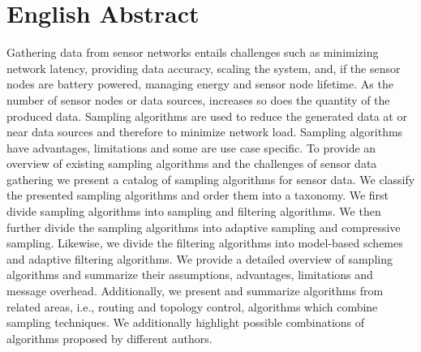 
\section*{English Abstract}
\begin{onehalfspace}
    Gathering data from sensor networks entails challenges such as minimizing
    network latency, providing data accuracy, scaling the system, and, if the
    sensor nodes are battery powered, managing energy and sensor node lifetime.
    As the number of sensor nodes or data sources, increases so does the
    quantity of the produced data. Sampling algorithms are used to reduce the
    generated data at or near data sources and therefore to minimize network
    load. Sampling algorithms have advantages, limitations and some are use
    case specific. To provide an overview of existing sampling algorithms and
    the challenges of sensor data gathering we present a catalog of sampling
    algorithms for sensor data. We classify the presented sampling algorithms
    and order them into a taxonomy. We first divide sampling algorithms into
    sampling and filtering algorithms. We then further divide the sampling
    algorithms into adaptive sampling and compressive sampling. Likewise, we
    divide the filtering algorithms into model-based schemes and adaptive
    filtering algorithms. We provide a detailed overview of sampling algorithms
    and summarize their assumptions, advantages, limitations and message
    overhead. Additionally, we present and summarize algorithms from related
    areas, i.e., routing and topology control, algorithms which combine
    sampling techniques. We additionally highlight possible combinations of
    algorithms proposed by different authors.
\end{onehalfspace}
\clearpage

